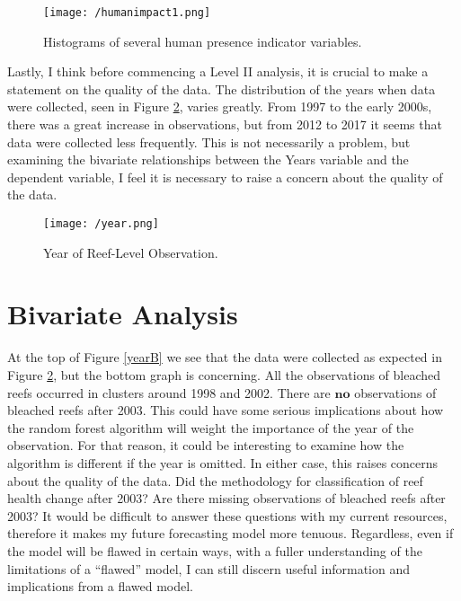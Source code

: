 \documentclass{article}
\begin{document}
\begin{figure}[!htb]
    \centering
    \texttt{[image: /humanimpact1.png]}
    \caption{Histograms of several human presence indicator variables.}
    \label{human}
\end{figure}

Lastly, I think before commencing a Level II analysis, it is crucial to make a statement on the quality of the data. The distribution of the years when data were collected, seen in Figure \ref{year}, varies greatly. From 1997 to the early 2000s, there was a great increase in observations, but from 2012 to 2017 it seems that data were collected less frequently. This is not necessarily a problem, but examining the bivariate relationships between the Years variable and the dependent variable, I feel it is necessary to raise a concern about the quality of the data. 

\begin{figure}[!htb]
    \centering
    \texttt{[image: /year.png]}
    \caption{Year of Reef-Level Observation.}
    \label{year}
\end{figure}

\newpage

\section{Bivariate Analysis}
At the top of Figure \ref{yearB} we see that the data were collected as expected in Figure \ref{year}, but the bottom graph is concerning. All the observations of bleached reefs occurred in clusters around 1998 and 2002. There are $\textbf{no}$ observations of bleached reefs after 2003. This could have some serious implications about how the random forest algorithm will weight the importance of the year of the observation. For that reason, it could be interesting to examine how the algorithm is different if the year is omitted. In either case, this raises concerns about the quality of the data. Did the methodology for classification of reef health change after 2003? Are there missing observations of bleached reefs after 2003? It would be difficult to answer these questions with my current resources, therefore it makes my future forecasting model more tenuous. Regardless, even if the model will be flawed in certain ways, with a fuller understanding of the limitations of a ``flawed'' model, I can still discern useful information and implications from a flawed model. \\
\end{document}
